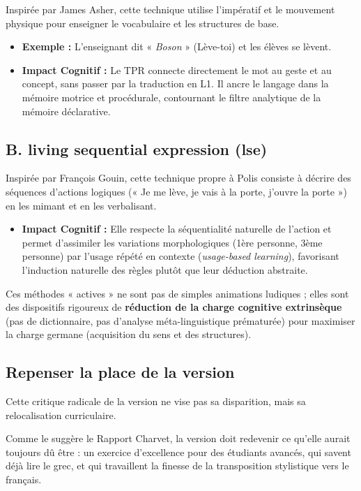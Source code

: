 Inspirée par James Asher, cette technique utilise l'impératif et le mouvement physique pour
enseigner le vocabulaire et les structures de base.\cite{II-3-1-ref61}

\begin{itemize}\item \textbf{Exemple :} L'enseignant dit « \textit{Boson\!} » (Lève-toi\!) et les élèves se lèvent.\item \textbf{Impact Cognitif :} Le TPR connecte directement le mot au geste et au concept, sans passer par la traduction en L1. Il ancre le langage dans la mémoire motrice et procédurale, contournant le filtre analytique de la mémoire déclarative.\cite{II-3-1-ref64}\end{itemize}

\subsection{B. living sequential expression (lse)}

Inspirée par François Gouin, cette technique propre à Polis consiste à décrire des séquences
d'actions logiques (« Je me lève, je vais à la porte, j'ouvre la porte ») en les mimant et en les
verbalisant.\cite{II-3-1-ref61}

\begin{itemize}\item \textbf{Impact Cognitif :} Elle respecte la séquentialité naturelle de l'action et permet d'assimiler les variations morphologiques (1ère personne, 3ème personne) par l'usage répété en contexte (\textit{usage-based learning}), favorisant l'induction naturelle des règles plutôt que leur déduction abstraite.\cite{II-3-1-ref61}\end{itemize}Ces méthodes « actives » ne sont pas de simples animations ludiques ; elles sont des dispositifs
rigoureux de \textbf{réduction de la charge cognitive extrinsèque} (pas de dictionnaire, pas
d'analyse méta-linguistique prématurée) pour maximiser la charge germane (acquisition du sens et des
structures).\cite{II-3-1-ref66}



\subsection{Repenser la place de la version}

Cette critique radicale de la version ne vise pas sa disparition, mais sa relocalisation
curriculaire.

Comme le suggère le Rapport Charvet, la version doit redevenir ce qu'elle aurait toujours dû être :
un exercice d'excellence pour des étudiants avancés, qui savent déjà lire le grec, et qui
travaillent la finesse de la transposition stylistique vers le français.\cite{II-3-1-ref16}

